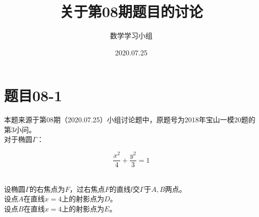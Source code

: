 \documentclass[UTF8]{ctexart}
\title{关于第08期题目的讨论}
\author{数学学习小组}
\date{2020.07.25}
\begin{document}
\maketitle

\newpage

\tableofcontents

\newpage

\setlength{\parindent}{0pt}
\setlength{\columnseprule}{0.4pt}
\setlength{\columnsep}{40pt}

\section{题目08-1}
    本题来源于第08期（2020.07.25）小组讨论题中，原题号为2018年宝山一模20题的第3小问。\\[3mm]
    对于椭圆$\Gamma$：
    \begin{large}
        \begin{equation*}
            \frac{x^2}{4}+\frac{y^2}{3}=1
        \end{equation*}
    \end{large}\\
    设椭圆$\Gamma$的右焦点为$F$，过右焦点$F$的直线$l$交$\Gamma$于$A,B$两点。\\[3mm]
    设点$A$在直线$x=4$上的射影点为$D$。\\[3mm]
    设点$B$在直线$x=4$上的射影点为$E$。
\end{document}
